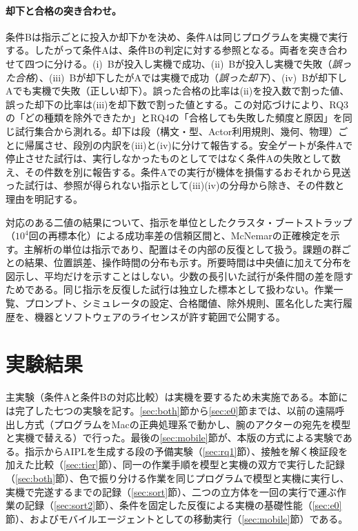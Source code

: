 \documentclass[10pt,letterpaper]{article}
\begin{document}
\paragraph{却下と合格の突き合わせ。}条件Bは指示ごとに投入か却下かを決め、条件Aは同じプログラムを実機で実行する。したがって条件Aは、条件Bの判定に対する参照となる。両者を突き合わせて四つに分ける。(i)~Bが投入し実機で成功、(ii)~Bが投入し実機で失敗（\emph{誤った合格}）、(iii)~Bが却下したがAでは実機で成功（\emph{誤った却下}）、(iv)~Bが却下しAでも実機で失敗（正しい却下）。誤った合格の比率は(ii)を投入数で割った値、誤った却下の比率は(iii)を却下数で割った値とする。この対応づけにより、RQ3の「どの種類を除外できたか」とRQ4の「合格しても失敗した頻度と原因」を同じ試行集合から測れる。却下は段（構文・型、Actor利用規則、幾何、物理）ごとに帰属させ、段別の内訳を(iii)と(iv)に分けて報告する。安全ゲートが条件Aで停止させた試行は、実行しなかったものとしてではなく条件Aの失敗として数え、その件数を別に報告する。条件Aでの実行が機体を損傷するおそれから見送った試行は、参照が得られない指示として(iii)(iv)の分母から除き、その件数と理由を明記する。

対応のある二値の結果について、指示を単位としたクラスタ・ブートストラップ（$10^{4}$回の再標本化）による成功率差の信頼区間と、McNemarの正確検定を示す。主解析の単位は指示であり、配置はその内部の反復として扱う。課題の群ごとの結果、位置誤差、操作時間の分布も示す。所要時間は中央値に加えて分布を図示し、平均だけを示すことはしない。少数の長引いた試行が条件間の差を隠すためである。同じ指示を反復した試行は独立した標本として扱わない。作業一覧、プロンプト、シミュレータの設定、合格閾値、除外規則、匿名化した実行履歴を、機器とソフトウェアのライセンスが許す範囲で公開する。

\section{実験結果}
主実験（条件Aと条件Bの対応比較）は実機を要するため未実施である。本節には完了した七つの実験を記す。\ref{sec:both}節から\ref{sec:e0}節までは、以前の遠隔呼出し方式（プログラムをMacの正典処理系で動かし、腕のアクターの宛先を模型と実機で替える）で行った。最後の\ref{sec:mobile}節が、本版の方式による実験である。指示からAIPLを生成する段の予備実験（\ref{sec:rq1}節）、接触を解く検証段を加えた比較（\ref{sec:tier}節）、同一の作業手順を模型と実機の双方で実行した記録（\ref{sec:both}節）、色で振り分ける作業を同じプログラムで模型と実機に実行し、実機で完遂するまでの記録（\ref{sec:sort}節）、二つの立方体を一回の実行で運ぶ作業の記録（\ref{sec:sort2}節）、条件を固定した反復による実機の基礎性能（\ref{sec:e0}節）、およびモバイルエージェントとしての移動実行（\ref{sec:mobile}節）である。
\end{document}
